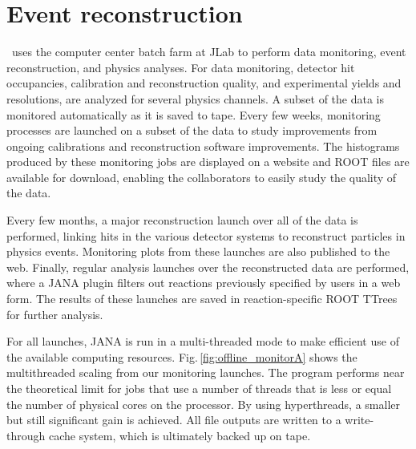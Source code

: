 

\section[Event reconstruction]{Event reconstruction \label{sec:reconstruction}} 


\GX~uses the computer center batch farm at JLab to perform data monitoring, event reconstruction, and physics analyses.  For data monitoring, detector hit occupancies, calibration and reconstruction quality, and experimental yields and resolutions, are analyzed for several physics channels.  A subset of the data is monitored automatically as it is saved to tape.  Every few weeks, monitoring processes are launched on a subset of the data to study improvements from ongoing calibrations and reconstruction software improvements.  The histograms produced by these monitoring jobs are displayed on a website and ROOT files are available for download, enabling the collaborators to easily study the quality of the data. 

Every few months, a major reconstruction launch over all of the data is performed, linking hits in the various detector systems to reconstruct particles in physics events.  Monitoring plots from these launches are also published to the web. Finally, regular analysis launches over the reconstructed data are performed, where a JANA plugin filters out reactions previously specified by users in a web form. The results of these launches are saved in reaction-specific ROOT TTrees for further analysis.

For all launches, JANA is run in a multi-threaded mode to make efficient use of the available computing resources. Fig.\,\ref{fig:offline_monitorA} shows the multithreaded scaling from our monitoring launches. The program performs near the theoretical limit for jobs that use a number of threads that is less or equal the number of physical cores on the processor. By using hyperthreads, a smaller but still significant gain is achieved.
All file outputs are written to a write-through cache system, which is ultimately backed up on tape.

